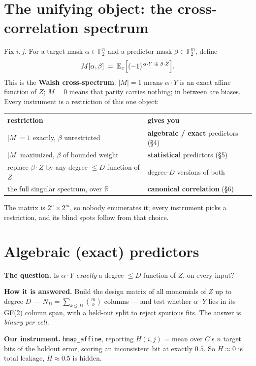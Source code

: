 \documentclass[11pt]{article}
\newcommand{\xor}{\oplus}
\newcommand{\code}[1]{\texttt{#1}}
\begin{document}
\section{The unifying object: the cross-correlation spectrum}

Fix $i,j$. For a target mask $\alpha \in \mathbb{F}_2^n$ and a predictor mask
$\beta \in \mathbb{F}_2^m$, define
\[
  M[\alpha,\beta] \;=\; \mathbb{E}_x\Bigl[(-1)^{\,\alpha \cdot Y \;\xor\; \beta \cdot Z}\Bigr].
\]
This is the \textbf{Walsh cross-spectrum}. $|M| = 1$ means $\alpha\cdot Y$ is an
exact affine function of $Z$; $M = 0$ means that parity carries nothing;
in between are biases. Every instrument is a restriction of this one object:

\begin{center}
\begin{tabular}{ll}
\toprule
restriction & gives you \\
\midrule
$|M| = 1$ exactly, $\beta$ unrestricted & \textbf{algebraic / exact} predictors (\S4) \\
$|M|$ maximized, $\beta$ of bounded weight & \textbf{statistical} predictors (\S5) \\
replace $\beta \cdot Z$ by any degree-$\le D$ function of $Z$ & degree-$D$ versions of both \\
the full singular spectrum, over $\mathbb{R}$ & \textbf{canonical correlation} (\S6) \\
\bottomrule
\end{tabular}
\end{center}

The matrix is $2^n \times 2^m$, so nobody enumerates it; every instrument picks
a restriction, and its blind spots follow from that choice.

\section{Algebraic (exact) predictors}

\textbf{The question.} Is $\alpha \cdot Y$ \emph{exactly} a degree-$\le D$
function of $Z$, on every input?

\textbf{How it is answered.} Build the design matrix of all monomials of $Z$ up
to degree $D$ --- $N_D = \sum_{k \le D}\binom{m}{k}$ columns --- and test whether
$\alpha \cdot Y$ lies in its GF(2) column span, with a held-out split to reject
spurious fits. The answer is \emph{binary per cell}.

\textbf{Our instrument.} \code{hmap\_affine}, reporting $H(i,j)$ = mean over
$C$'s $n$ target bits of the holdout error, scoring an inconsistent bit at
exactly $0.5$. So $H \approx 0$ is total leakage, $H \approx 0.5$ is hidden.
\end{document}
